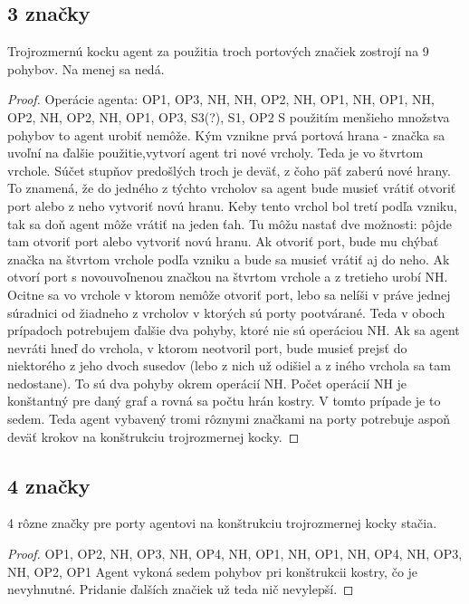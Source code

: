 \subsection{3 značky}
\begin{veta}
Trojrozmernú kocku agent za použitia troch portových značiek zostrojí na 9
pohybov. Na menej sa nedá.
\end{veta}
\begin{proof}
Operácie agenta: OP1, OP3, NH, NH, OP2, NH, OP1, NH, OP1, NH, OP2, NH, OP2,
NH, OP1, OP3, S3(?), S1, OP2
S použitím menšieho množstva pohybov to agent urobiť nemôže. Kým vznikne
prvá portová hrana - značka sa uvoľní na ďalšie použitie,vytvorí agent tri
nové vrcholy. Teda je vo štvrtom vrchole. Súčet  stupňov predošlých troch je
deväť, z čoho päť zaberú nové hrany. To znamená, že do jedného z týchto
vrcholov sa agent bude musieť vrátiť otvoriť port alebo z neho vytvoriť novú
hranu. Keby tento vrchol bol tretí podľa vzniku, tak sa doň agent môže
vrátiť na jeden ťah. Tu môžu nastať dve možnosti: pôjde tam otvoriť port
alebo vytvoriť novú hranu. Ak otvoriť port, bude mu chýbať značka na štvrtom
vrchole podľa vzniku a bude sa musieť vrátiť aj do neho. Ak otvorí port s
novouvoľnenou značkou na štvrtom vrchole a z tretieho urobí NH. Ocitne sa vo
vrchole v ktorom nemôže otvoriť port, lebo sa nelíši v práve jednej
súradnici od žiadneho z vrcholov v ktorých sú porty pootvárané. Teda v oboch
prípadoch potrebujem ďalšie dva pohyby, ktoré nie sú operáciou NH. Ak sa
agent nevráti hneď do vrchola, v ktorom neotvoril port, bude musieť prejsť
do niektorého z jeho dvoch susedov (lebo z nich už odišiel a z iného vrchola
sa tam nedostane). To sú dva pohyby okrem operácií NH. Počet operácií NH je
konštantný pre daný  graf a rovná sa počtu hrán kostry. V tomto prípade je
to sedem. Teda agent vybavený tromi rôznymi značkami na porty potrebuje
aspoň deväť krokov na konštrukciu trojrozmernej kocky.
\end{proof}

\subsection{4 značky}
\begin{veta}
4 rôzne značky pre porty agentovi na konštrukciu trojrozmernej kocky stačia.
\end{veta}
\begin{proof}

OP1, OP2, NH, OP3, NH, OP4, NH, OP1, NH, OP1, NH, OP4, NH, OP3, NH, OP2, OP1
Agent vykoná sedem pohybov pri konštrukcii kostry, čo je nevyhnutné.
Pridanie ďalších značiek už teda nič nevylepší.
\end{proof}

